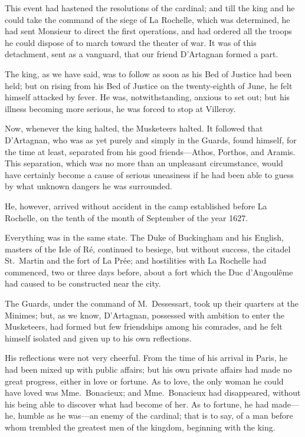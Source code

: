This event had hastened the resolutions of the cardinal; and till the king and he could take the command of the siege of La Rochelle, which was determined, he had sent Monsieur to direct the first operations, and had ordered all the troops he could dispose of to march toward the theater of war. It was of this detachment, sent as a vanguard, that our friend D'Artagnan formed a part. 

The king, as we have said, was to follow as soon as his Bed of Justice had been held; but on rising from his Bed of Justice on the twenty-eighth of June, he felt himself attacked by fever. He was, notwithstanding, anxious to set out; but his illness becoming more serious, he was forced to stop at Villeroy. 

Now, whenever the king halted, the Musketeers halted. It followed that D'Artagnan, who was as yet purely and simply in the Guards, found himself, for the time at least, separated from his good friends—Athos, Porthos, and Aramis. This separation, which was no more than an unpleasant circumstance, would have certainly become a cause of serious uneasiness if he had been able to guess by what unknown dangers he was surrounded. 

He, however, arrived without accident in the camp established before La Rochelle, on the tenth of the month of September of the year 1627. 

Everything was in the same state. The Duke of Buckingham and his English, masters of the Isle of Ré, continued to besiege, but without success, the citadel St.~Martin and the fort of La Prée; and hostilities with La Rochelle had commenced, two or three days before, about a fort which the Duc d'Angoulême had caused to be constructed near the city. 

The Guards, under the command of M.~Dessessart, took up their quarters at the Minimes; but, as we know, D'Artagnan, possessed with ambition to enter the Musketeers, had formed but few friendships among his comrades, and he felt himself isolated and given up to his own reflections. 

His reflections were not very cheerful. From the time of his arrival in Paris, he had been mixed up with public affairs; but his own private affairs had made no great progress, either in love or fortune. As to love, the only woman he could have loved was Mme.~Bonacieux; and Mme.~Bonacieux had disappeared, without his being able to discover what had become of her. As to fortune, he had made—he, humble as he was—an enemy of the cardinal; that is to say, of a man before whom trembled the greatest men of the kingdom, beginning with the king. 

